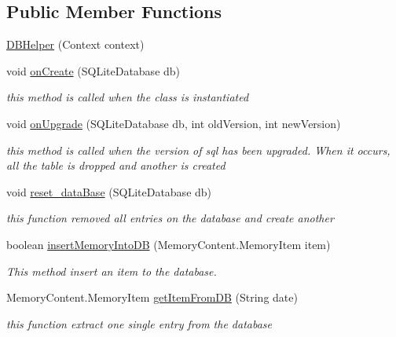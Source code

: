 \subsection*{Public Member Functions}
\begin{DoxyCompactItemize}
\item 
\hyperlink{classcom_1_1example_1_1memorism_1_1memory_1_1_d_b_helper_a1a910311426223624f16314574fc8395}{D\+B\+Helper} (Context context)
\item 
void \hyperlink{classcom_1_1example_1_1memorism_1_1memory_1_1_d_b_helper_af116d080f66582b43bf7cc392862f1cd}{on\+Create} (S\+Q\+Lite\+Database db)
\begin{DoxyCompactList}\small\item\em this method is called when the class is instantiated \end{DoxyCompactList}\item 
void \hyperlink{classcom_1_1example_1_1memorism_1_1memory_1_1_d_b_helper_a10e47b5b5978e7f89ec326cf3782c2b0}{on\+Upgrade} (S\+Q\+Lite\+Database db, int old\+Version, int new\+Version)
\begin{DoxyCompactList}\small\item\em this method is called when the version of sql has been upgraded. When it occurs, all the table is dropped and another is created \end{DoxyCompactList}\item 
void \hyperlink{classcom_1_1example_1_1memorism_1_1memory_1_1_d_b_helper_a5a10d27ab67b8b21fe6a4791138596a2}{reset\+\_\+data\+Base} (S\+Q\+Lite\+Database db)
\begin{DoxyCompactList}\small\item\em this function removed all entries on the database and create another \end{DoxyCompactList}\item 
boolean \hyperlink{classcom_1_1example_1_1memorism_1_1memory_1_1_d_b_helper_a377fbc795ffd8620bd16276bc373f9e9}{insert\+Memory\+Into\+DB} (Memory\+Content.\+Memory\+Item item)
\begin{DoxyCompactList}\small\item\em This method insert an item to the database. \end{DoxyCompactList}\item 
Memory\+Content.\+Memory\+Item \hyperlink{classcom_1_1example_1_1memorism_1_1memory_1_1_d_b_helper_ae2b30388cd48178666c0fa93ef9362b6}{get\+Item\+From\+DB} (String date)
\begin{DoxyCompactList}\small\item\em this function extract one single entry from the database \end{DoxyCompactList}\item 

\end{DoxyCompactItemize}
